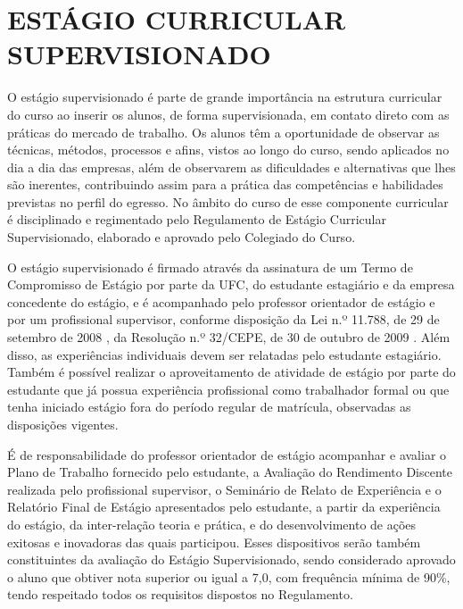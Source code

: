 \chapter{ESTÁGIO CURRICULAR SUPERVISIONADO}
\label{cap:estagio-curricular-supervisionado}

O estágio supervisionado é parte de grande importância na estrutura curricular do curso ao inserir os alunos, de forma supervisionada, em contato direto com as práticas do mercado de trabalho. Os alunos têm a oportunidade de observar as técnicas, métodos, processos e afins, vistos ao longo do curso, sendo aplicados no dia a dia das empresas, além de observarem as dificuldades e alternativas que lhes são inerentes, contribuindo assim para a prática das competências e habilidades previstas no perfil do egresso. No âmbito do curso de \nomedocurso esse componente curricular é disciplinado e regimentado pelo Regulamento de Estágio Curricular Supervisionado, elaborado e aprovado pelo Colegiado do Curso.

O estágio supervisionado é firmado através da assinatura de um Termo de Compromisso de Estágio por parte da UFC, do estudante estagiário e da empresa concedente do estágio, e é acompanhado pelo professor orientador de estágio e por um profissional supervisor, conforme disposição da Lei n.º 11.788, de 29 de setembro de 2008 \cite{brasil2008lei11788}, da Resolução n.º 32/CEPE, de 30 de outubro de 2009 \cite{ufc2009resolucao32}. Além disso, as experiências individuais devem ser relatadas pelo estudante estagiário. Também é possível realizar o aproveitamento de atividade de estágio por parte do estudante que já possua experiência profissional como trabalhador formal ou que tenha iniciado estágio fora do período regular de matrícula, observadas as disposições vigentes.

É de responsabilidade do professor orientador de estágio acompanhar e avaliar o Plano de Trabalho fornecido pelo estudante, a Avaliação do Rendimento Discente realizada pelo profissional supervisor, o Seminário de Relato de Experiência e o Relatório Final de Estágio apresentados pelo estudante, a partir da experiência do estágio, da inter-relação teoria e prática, e do desenvolvimento de ações exitosas e inovadoras das quais participou. Esses dispositivos serão também constituintes da avaliação do Estágio Supervisionado, sendo considerado aprovado o aluno que obtiver nota superior ou igual a 7,0, com frequência mínima de 90\%, tendo respeitado todos os requisitos dispostos no Regulamento.

